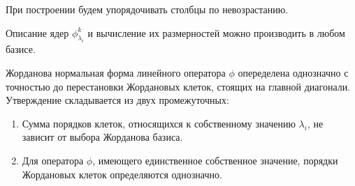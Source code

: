 \begin{agreement}
    При построении будем упорядочивать столбцы по невозрастанию.
\end{agreement}

\begin{note}
    Описание ядер $\phi_{\lambda_i}^k$ и вычисление их размерностей можно производить в любом базисе.
\end{note}

\begin{theorem}[]
    Жорданова нормальная форма линейного оператора $\phi$ опеределена однозначно с точностью до перестановки Жордановых клеток, стоящих на главной диагонали. 
    Утверждение складывается из двух промежуточных:
    \begin{enumerate}
        \item Сумма порядков клеток, относящихся к собственному значению $\lambda_i$, не зависит от выбора Жорданова базиса.
        \item Для оператора $\phi$, имеющего единственное собственное значение, порядки Жордановых клеток определяются однозначно.
    \end{enumerate}
\end{theorem}

